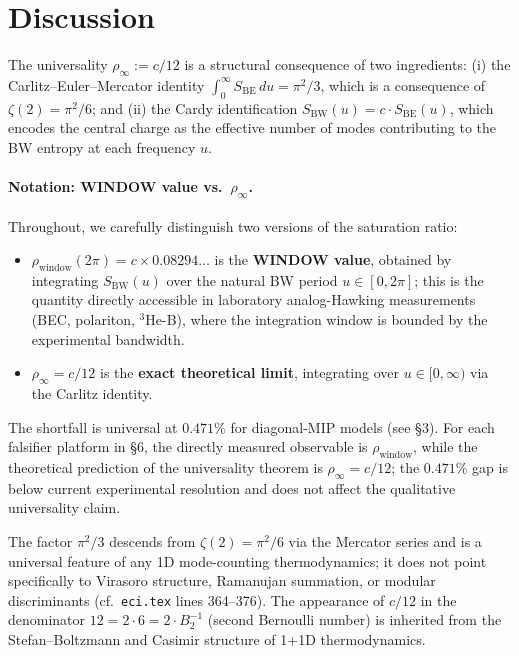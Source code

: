 \documentclass[12pt]{article}
\begin{document}
\section{Discussion}

The universality $\rho_\infty := c/12$ is a structural consequence of two
ingredients: (i) the Carlitz--Euler--Mercator identity
$\int_0^\infty S_{\mathrm{BE}}\,du = \pi^2/3$, which is a consequence
of $\zeta(2) = \pi^2/6$; and (ii) the Cardy identification
$S_{\mathrm{BW}}(u) = c\cdot S_{\mathrm{BE}}(u)$, which encodes the
central charge as the effective number of modes contributing to the BW
entropy at each frequency $u$.

\paragraph{Notation: WINDOW value vs.\ $\rho_\infty$.}
Throughout, we carefully distinguish two versions of the saturation ratio:
\begin{itemize}
\item $\rho_{\mathrm{window}}(2\pi) = c \times 0.08294\ldots$ is the
  \textbf{WINDOW value}, obtained by integrating $S_{\mathrm{BW}}(u)$
  over the natural BW period $u\in[0,2\pi]$; this is the quantity
  directly accessible in laboratory analog-Hawking measurements (BEC,
  polariton, ${}^3$He-B), where the integration window is bounded by
  the experimental bandwidth.
\item $\rho_\infty = c/12$ is the \textbf{exact theoretical limit},
  integrating over $u\in[0,\infty)$ via the Carlitz identity.
\end{itemize}
The shortfall is universal at $0.471\%$ for diagonal-MIP models (see \S3).
For each falsifier platform in \S6, the directly measured observable is
$\rho_{\mathrm{window}}$, while the theoretical prediction of the
universality theorem is $\rho_\infty = c/12$; the $0.471\%$ gap is
below current experimental resolution and does not affect the
qualitative universality claim.

The factor $\pi^2/3$ descends from $\zeta(2) = \pi^2/6$ via the
Mercator series and is a universal feature of any 1D mode-counting
thermodynamics; it does not point specifically to Virasoro structure,
Ramanujan summation, or modular discriminants
(cf.\ \texttt{eci.tex} lines 364--376).  The appearance of
$c/12$ in the denominator $12 = 2\cdot 6 = 2\cdot B_2^{-1}$ (second
Bernoulli number) is inherited from the Stefan--Boltzmann and Casimir
structure of 1+1D thermodynamics.
\end{document}
